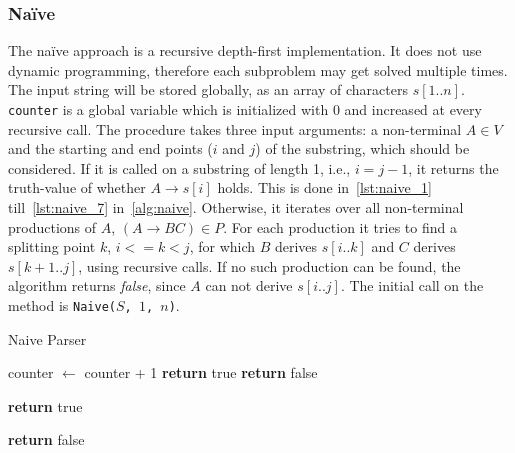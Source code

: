 \subsubsection{Na\"{i}ve}

The na\"{i}ve approach is a recursive depth-first implementation.
It does not use dynamic programming, therefore each subproblem may get solved multiple times.
The input string will be stored globally, as an array of characters $s[1..n]$.
\texttt{counter} is a global variable which is initialized with $0$ and increased at every recursive call.
The procedure takes three input arguments: a non-terminal $A\in V$ and the starting and end points ($i$ and $j$) of the substring, which should be considered.
If it is called on a substring of length 1, i.e., $i = j-1$, it returns the truth-value of whether $A\rightarrow s[i]$ holds.
This is done in~\cref{lst:naive_1} till~\cref{lst:naive_7} in~\cref{alg:naive}.
Otherwise, it iterates over all non-terminal productions of $A$, $(A\rightarrow BC) \in P$.
For each production it tries to find a splitting point $k$, $i <= k < j$, for which $B$ derives $s[i..k]$ and $C$ derives $s[k+1..j]$, using recursive calls.
If no such production can be found, the algorithm returns \textit{false}, since $A$ can not derive $s[i..j]$.
The initial call on the method is \texttt{Naive($S$, $1$, $n$)}.

\begin{algorithm}[H]
    \caption{Naive Parser}
    \label{alg:naive}
    \begin{algorithmic}[1]
        \State counter $\leftarrow$ counter + 1
         \label{lst:naive_1}
                \State \textbf{return} true \label{lst:naive_ret_1}
            \Else
                \State \textbf{return} false \label{lst:naive_ret_2}
            \EndIf
        \EndIf \label{lst:naive_7}

                    \State \textbf{return} true
                \EndIf
            \EndFor
        \EndFor

        \State \textbf{return} false
        \EndFunction
    \end{algorithmic}
\end{algorithm}


